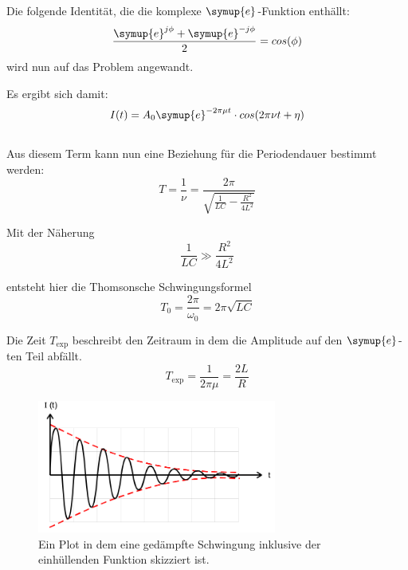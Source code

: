         \noindent Die folgende Identität, die die komplexe $\symup{e}$-Funktion enthällt:
        \begin{equation}
            \frac{\symup{e}^{j \phi} + \symup{e}^{-j \phi}}{2} = cos(\phi) \nonumber
        \end{equation}
        \noindent wird nun auf das Problem angewandt.

        \noindent Es ergibt sich damit:
        \begin{equation}
            I(t) = A_0 \symup{e}^{- 2 \pi \mu t} \cdot cos(2\pi \nu t + \eta) \nonumber
        \end{equation}
        \\
        \noindent Aus diesem Term kann nun eine Beziehung für die Periodendauer bestimmt werden:
        \begin{equation}
            T = \frac{1}{\nu} = \frac{2 \pi}{\sqrt{\frac{1}{LC}-\frac{R^2}{4L^2}}} \nonumber
        \end{equation}

        \noindent Mit der Näherung
        \begin{equation}
            \frac{1}{LC} \gg \frac{R^2}{4L^2} \nonumber
        \end{equation}

        \noindent entsteht hier die Thomsonsche Schwingungsformel
        \begin{equation}
            T_0 = \frac{2\pi}{\omega_0} = 2\pi \sqrt{LC} \nonumber
        \end{equation}

        \noindent Die Zeit $T_{\text{exp}}$ beschreibt den Zeitraum in dem die Amplitude auf den $\symup{e}$-ten Teil abfällt.
        \begin{equation}
            T_{\text{exp}} = \frac{1}{2 \pi \mu } = \frac{2L}{R} \nonumber
        \end{equation}

        \begin{figure}[H]
            \centering
            \includegraphics[width=0.7\textwidth]{images/ged.PNG}
            \caption{Ein Plot in dem eine gedämpfte Schwingung inklusive der einhüllenden Funktion skizziert ist\protect \cite{V354}.}
            \label{img:gedSch}
        \end{figure}

